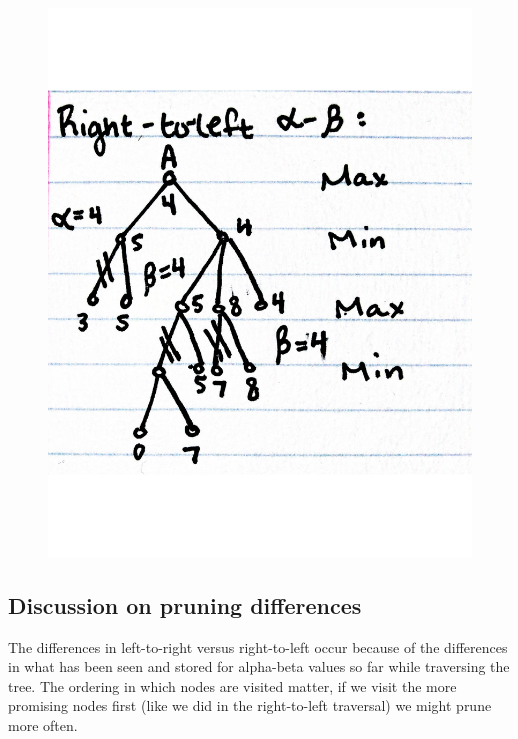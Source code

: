 \documentclass[11pt]{article}
\begin{document}
\begin{figure}[H]
\centering
\includegraphics[scale=.5]{rtol.pdf}
\end{figure} 

\subsection{Discussion on pruning differences}

The differences in left-to-right versus right-to-left occur because of the differences in what has been seen and stored for alpha-beta values so far while traversing the tree. The ordering in which nodes are visited matter, if we visit the more promising nodes first (like we did in the right-to-left traversal) we might prune more often.
\end{document}
